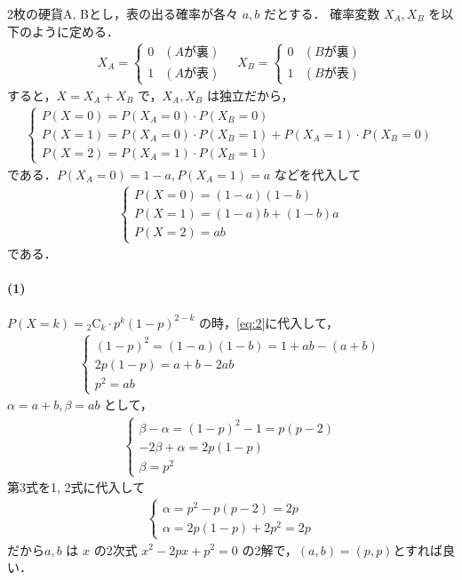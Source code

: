 \documentclass[../../main.tex]{subfiles}
\begin{document}
2枚の硬貨A, Bとし，表の出る確率が各々 $a, b$ だとする．
確率変数 $X_A, X_B$ を以下のように定める．
\begin{align}
  X_A =
  \begin{cases} 0 & (A\text{が裏}) \\ 1 & (A\text{が表})
  \end{cases} \quad
  X_B =
  \begin{cases} 0 & (B\text{が裏}) \\ 1 & (B\text{が表})
  \end{cases}
\end{align}
すると，$X = X_A + X_B$ で，$X_A, X_B$ は独立だから，
\begin{align}
  \begin{cases}
    P(X=0) = P(X_A=0) \cdot P(X_B=0) \\
    P(X=1) = P(X_A=0) \cdot P(X_B=1) + P(X_A=1) \cdot P(X_B=0) \\
    P(X=2) = P(X_A=1) \cdot P(X_B=1)
  \end{cases} \label{eq:1}
\end{align}
である．$P(X_A=0) = 1-a, P(X_A=1) = a$ などを代入して
\begin{align}
  \begin{cases}
    P(X=0) = (1-a)(1-b) \\
    P(X=1) = (1-a)b + (1-b)a \\
    P(X=2) = ab
  \end{cases} \label{eq:2}
\end{align}
である．

\paragraph{(1)}

$P(X=k) = {}_2\mathrm{C}_k \cdot p^k (1-p)^{2-k}$ の時，\cref{eq:2}に代入して，
\begin{align}
  \begin{cases}
    (1-p)^2 = (1-a)(1-b) = 1 + ab - (a+b) \\
    2p(1-p) = a + b - 2ab \\
    p^2 = ab
  \end{cases}
\end{align}
$\alpha = a+b, \beta = ab$ として，
\begin{align}
  \begin{cases}
    \beta - \alpha = (1-p)^2 - 1 = p(p-2) \\
    -2\beta + \alpha = 2p(1-p) \\
    \beta = p^2
  \end{cases}
\end{align}
第3式を1, 2式に代入して
\begin{align}
  \begin{cases}
    \alpha = p^2 - p(p-2) = 2p \\
    \alpha = 2p(1-p) + 2p^2 = 2p
  \end{cases}
\end{align}
だから$a, b$ は $x$ の2次式 $x^2 - 2px + p^2 = 0$ の2解で，$(a, b) = (p, p)$とすれば良い．
\end{document}
